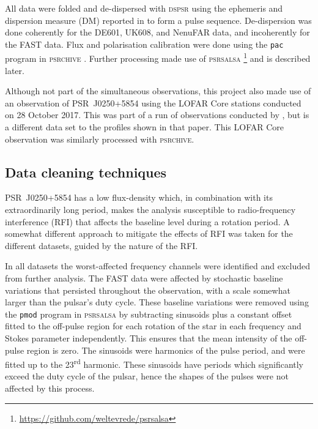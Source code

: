 All data were folded and de-dispersed with \textsc{dspsr} \citep{SBxx2011} using the ephemeris and dispersion measure (DM) reported in \citet{TBC+2018} to form a pulse sequence. De-dispersion was done coherently for the DE601, UK608, and NenuFAR data, and incoherently for the FAST data. Flux and polarisation calibration were done using the \texttt{pac} program in \textsc{psrchive} \citep{SMJR2010}. Further processing made use of \textsc{psrsalsa} \citep{Wxxx2016}\footnote{\url{https://github.com/weltevrede/psrsalsa}} and is described later.

Although not part of the simultaneous observations, this project also made use of an observation of PSR~J0250+5854 using the LOFAR Core stations \citep{HWG+2013} conducted on 28 October 2017. This was part of a run of observations conducted by \citet{TBC+2018}, but is a different data set to the profiles shown in that paper. This LOFAR Core observation was similarly processed with \textsc{psrchive}.













\subsection{Data cleaning techniques}
\label{sec: J0250 - observations - cleaning}

PSR~J0250+5854 has a low flux-density which, in combination with its extraordinarily long period, makes the analysis susceptible to radio-frequency interference (RFI) that affects the baseline level during a rotation period. A somewhat different approach to mitigate the effects of RFI was taken for the different datasets, guided by the nature of the RFI.

In all datasets the worst-affected frequency channels were identified and excluded from further analysis. The FAST data were affected by stochastic baseline variations that persisted throughout the observation, with a scale somewhat larger than the pulsar's duty cycle. These baseline variations were removed using the \texttt{pmod} program in \textsc{psrsalsa} by subtracting sinusoids plus a constant offset fitted to the off-pulse region for each rotation of the star in each frequency and Stokes parameter independently. This ensures that the mean intensity of the off-pulse region is zero. The sinusoids were harmonics of the pulse period, and were fitted up to the 23\textsuperscript{rd} harmonic. These sinusoids have periods which significantly exceed the duty cycle of the pulsar, hence the shapes of the pulses were not affected by this process.

